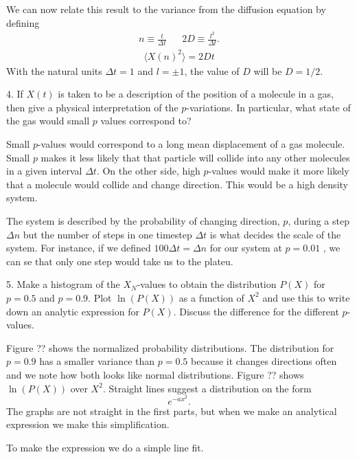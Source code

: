 \documentclass[twocolumn]{article}[10pt]
\begin{document}
We can now relate this result to the variance from the diffusion equation by
defining 
\begin{align*}
n \equiv \frac{t}{\Delta t} && 2D \equiv \frac{l^2}{\Delta t}.
\end{align*}
\begin{align*}
\langle X(n)^2\rangle = 2Dt
\end{align*}
With the natural units $\Delta t = 1$ and $l = \pm1$, 
the value of $D$ will be $D = 1/2$.

{\color{black!70} 
4. If $X(t)$ is taken to be a description of the position of a molecule 
in a gas, then give a physical interpretation of the $p$-variations.
In particular, what state of the gas would small $p$ values 
correspond to?
}

Small $p$-values would correspond to a long mean displacement of a gas
molecule. Small $p$ makes it less likely that that particle will collide
into any other molecules in a given interval $\Delta t$. On the other 
side, high $p$-values would make it more likely that a molecule would
collide and change direction. This would be a high density system. 

The system is described by the probability of changing direction, $p$,
during a step $\Delta n$ but the number of steps in one timestep
$\Delta t$ is what decides the scale of the system. For instance,
if we defined $100\Delta t = \Delta n$ for our system at $p = 0.01$
, we can se that only one step would take us to the plateu. 

{\color{black!70} 
5. Make a histogram of the $X_N$-values to obtain the distribution 
$P(X)$ for $p=0.5$ and $p = 0.9$. Plot $\ln(P(X))$ as a function
of $X^2$ and use this to write down an analytic expression for
$P(X)$. Discuss the difference for the different $p$-values. 
}

Figure ?? shows the normalized probability distributions. 
The distribution for  $p=0.9$ has a smaller variance than 
$p=0.5$ because it changes directions often and we note
how both looks like normal distributions. Figure ?? shows
$\ln(P(X))$ over $X^2$. Straight lines suggest a distribution
on the form $$e^{-ax^2}.$$ The graphs are not straight in the
first parts, but when we make an analytical expression we
make this simplification. 

To make the expression we do a simple line fit. 
\end{document}
